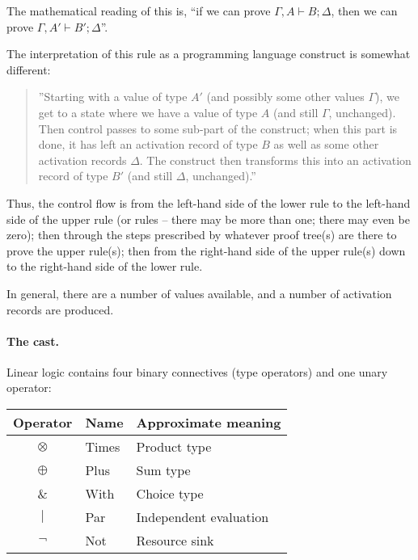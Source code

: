 \documentclass[a4paper]{article}
\begin{document}
The mathematical reading of this is, ``if we can prove ${\Gamma,A
  \vdash B;\Delta}$, then we can prove ${\Gamma,A' \vdash B';\Delta}$''.


The interpretation of this rule as a programming language construct is
somewhat different:
\begin{quote}
  ''Starting with a value of type $A'$ (and possibly some other values
  $\Gamma$), we get to a state where we have a value of type $A$ (and
  still $\Gamma$, unchanged). Then control passes to some sub-part of
  the construct; when this part is done, it has left an activation
  record of type $B$ as well as some other activation records
  $\Delta$. The construct then transforms this into an activation
  record of type $B'$ (and still $\Delta$, unchanged).''
\end{quote}

Thus, the control flow is from the left-hand side of the lower rule to
the left-hand side of the upper rule (or rules -- there may be more
than one; there may even be zero); then through the steps prescribed
by whatever proof tree(s) are there to prove the upper rule(s); then
from the right-hand side of the upper rule(s) down to the right-hand
side of the lower rule.

In general, there are a number of values available, and a number of
activation records are produced.

\paragraph{The cast.} Linear logic contains four binary connectives (type operators) and
one unary operator:
\begin{center}
  \begin{tabular}{c|l|l}
    \hline
    \hline
    Operator & Name & Approximate meaning\\
    \hline
    $\otimes$ & Times & Product type\\
    $\oplus$  & Plus  & Sum type\\
    $\&$      & With  & Choice type\\
    $|$       & Par   & Independent evaluation\\
    \hline
    $\lnot$   & Not   & Resource sink\\
    \hline
  \end{tabular}
\end{center}
\end{document}
